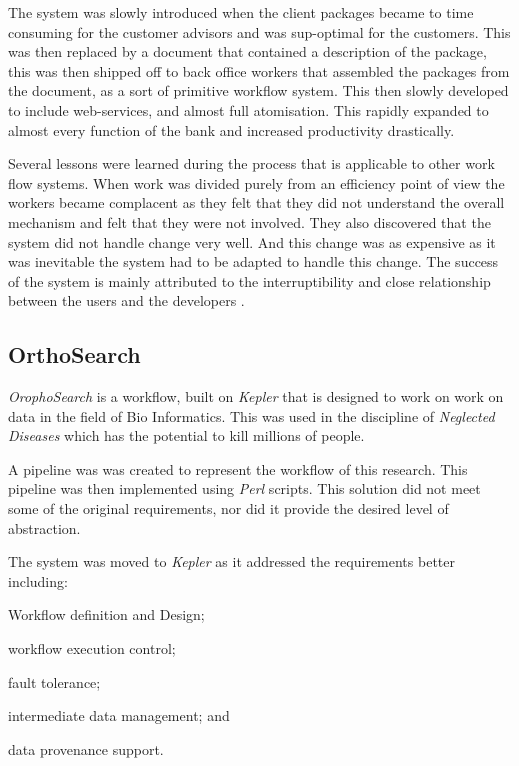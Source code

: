 \documentclass[11pt,twocolumn]{article}
\begin{document}
      The system was slowly introduced when the client
      packages became to time consuming for the customer
      advisors and was sup-optimal for the customers.
      This was then replaced by a document that contained
      a description of the package, this was then shipped
      off to back office workers that assembled the packages
      from the document, as a sort of primitive workflow system.
      This then slowly developed to include web-services,
      and almost full atomisation. This rapidly expanded
      to almost every function of the bank and increased
      productivity drastically.

      Several lessons were learned during the process that
      is applicable to other work flow systems. When work
      was divided purely from an efficiency point of view
      the workers became complacent as they felt that they
      did not understand the overall mechanism and felt that
      they were not involved. They also discovered that the
      system did not handle change very well. And this change
      was as expensive as it was inevitable the system had
      to be adapted to handle this change. The success of the
      system is mainly attributed to the interruptibility and
      close relationship between the users and the developers
      \cite{Brahe:2007:SWW:1316624.1316661}.

    \subsection*{OrthoSearch}
      \emph{OrophoSearch} is a workflow,
      built on \emph{Kepler} that is designed to work on
      work on data in the field of Bio Informatics. This
      was used in the discipline of \emph{Neglected Diseases}
      which has the potential to kill millions of people.

      A pipeline was was created to represent the workflow
      of this research. This pipeline was then implemented
      using \emph{Perl} scripts. This solution did not meet
      some of the original requirements, nor did it provide
      the desired level of abstraction.

      The system was moved to \emph{Kepler} as it addressed
      the requirements better including: \begin{inparaenum}[(i)]
      \item Workflow definition and Design; \item workflow execution
      control; \item fault tolerance; \item intermediate data management;
      and \item data provenance support. \end{inparaenum}
\end{document}
